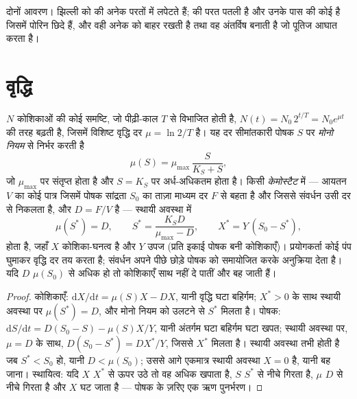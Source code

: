 \begin{omfigure}
{\small दोनों आवरण।  झिल्ली को  की अनेक
परतों में लपेटते हैं;  की परत पतली है और उनके पास
 की कोई  है जिसमें पोरिन छिदे हैं, और वही
अनेक  को बाहर रखती है तथा वह अंतर्विष बनाती है जो पूतिज
आघात करता है।}
\end{omfigure}

\section{वृद्धि}

\begin{theorem}[चरघातांकी वृद्धि, मोनो नियम और केमोस्टैट]\label{thm:b3:bacteriology:monod}
$N$ कोशिकाओं की कोई समष्टि, जो पीढ़ी-काल $T$ से विभाजित होती है,
$N(t) = N_{0}\,2^{t/T} = N_{0}e^{\mu t}$ की तरह बढ़ती है, जिसमें विशिष्ट
वृद्धि दर $\mu =
\ln 2/T$ है। यह दर सीमांतकारी पोषक $S$ पर
\emph{मोनो नियम} से निर्भर करती है
\[
\mu(S) = \mu_{\max}\,\frac{S}{K_{S} + S},
\]
जो $\mu_{\max}$ पर संतृप्त होता है और $S = K_{S}$ पर अर्ध-अधिकतम होता
है। किसी \emph{केमोस्टैट} में --- आयतन $V$ का कोई पात्र जिसमें पोषक
सांद्रता $S_{0}$ का ताज़ा माध्यम दर $F$ से बहता है और जिससे संवर्धन उसी
दर से निकलता है, और  $D = F/V$ है --- स्थायी अवस्था में
\[
\mu(S^{*}) = D,\qquad S^{*} = \frac{K_{S}D}{\mu_{\max} - D},\qquad
X^{*} = Y\,(S_{0} - S^{*}),
\]
होता है, जहाँ $X$ कोशिका-घनत्व है और $Y$ उपज (प्रति इकाई पोषक बनी
कोशिकाएँ)। प्रयोगकर्ता कोई पंप घुमाकर वृद्धि दर तय करता है; संवर्धन
अपने पीछे छोड़े पोषक को समायोजित करके अनुक्रिया देता है। यदि $D$
$\mu(S_{0})$ से अधिक हो तो कोशिकाएँ साथ नहीं दे पातीं और बह जाती हैं।
\end{theorem}
\begin{proof}
कोशिकाएँ: $\mathrm{d}X/\mathrm{d}t = \mu(S)X - DX$, यानी वृद्धि घटा
बहिर्गम; $X^{*} > 0$ के साथ स्थायी अवस्था पर $\mu(S^{*}) = D$, और मोनो
नियम को उलटने से $S^{*}$ मिलता है। पोषक: $\mathrm{d}S/\mathrm{d}t = D(S_{0} -
S) - \mu(S)X/Y$, यानी अंतर्गम घटा बहिर्गम घटा खपत; स्थायी
अवस्था पर, $\mu = D$ के साथ, $D(S_{0} - S^{*}) = DX^{*}/Y$, जिससे $X^{*}$
मिलता है। स्थायी अवस्था तभी होती है जब $S^{*} < S_{0}$ हो, यानी $D <
\mu(S_{0})$; उससे आगे एकमात्र स्थायी अवस्था $X = 0$ है, यानी बह जाना।
स्थायित्व: यदि $X$ $X^{*}$ से ऊपर उठे तो वह अधिक खपाता है, $S$
$S^{*}$ से नीचे गिरता है, $\mu$ $D$ से नीचे गिरता है और $X$ घट जाता है
--- पोषक के ज़रिए एक ऋण पुनर्भरण।
\end{proof}

